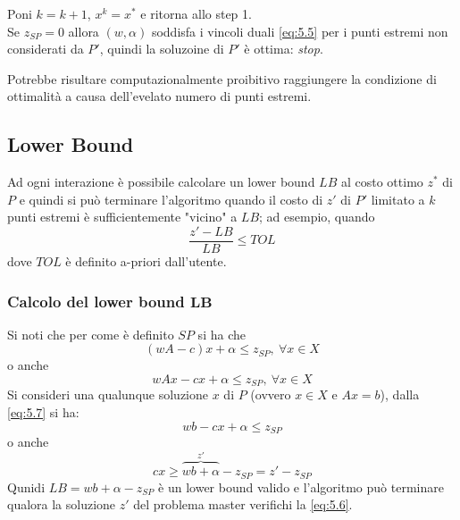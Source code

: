\begin{enumerate}
	Poni $k=k+1$, $x^{k}=x^{*}$ e ritorna allo step 1.\\
	Se $z_{SP}=0$ allora $(w,\alpha)$ soddisfa i vincoli duali \ref{eq:5.5} per i punti estremi non considerati da $P'$, quindi la soluzoine di $P'$ è ottima: \textit{stop}.
\end{enumerate}
Potrebbe risultare computazionalmente proibitivo raggiungere la condizione di ottimalità a causa dell'evelato numero di punti estremi.

\clearpage
\subsection{Lower Bound}
Ad ogni interazione è possibile calcolare un lower bound $LB$ al costo ottimo $z^{*}$ di $P$ e quindi si può terminare l'algoritmo quando il costo di $z'$ di $P'$ limitato a $k$ punti estremi è sufficientemente "vicino" a $LB$; ad esempio, quando
\begin{equation}
	\frac{z'-LB}{LB}\le TOL \label{eq:5.6}
\end{equation}
dove $TOL$ è definito a-priori dall'utente.
\subsubsection{Calcolo del lower bound $\boldsymbol{LB}$}
Si noti che per come è definito $SP$ si ha che
\begin{equation*}
	(w A-c)x+\alpha\le z_{SP},\ \forall x\in X
\end{equation*}
o anche
\begin{equation}
	w Ax-cx+\alpha\le z_{SP}, \ \forall x\in X \label{eq:5.7}
\end{equation}
Si consideri una qualunque soluzione $x$ di $P$ (ovvero $x\in X$ e $Ax=b$), dalla \ref{eq:5.7} si ha:
\begin{equation*}
	w b-cx+\alpha\le z_{SP}
\end{equation*}
o anche
\begin{equation*}
	cx\ge\overbrace{w b+\alpha}^{z'}-z_{SP}=z'-z_{SP}
\end{equation*}
Qunidi $LB=w b+\alpha-z_{SP}$ è un lower bound valido e l'algoritmo può terminare qualora la soluzione $z'$ del problema master verifichi la \ref{eq:5.6}.

